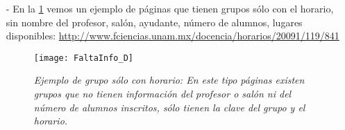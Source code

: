 \begin{itemize}
\item[-] En la \figurename{\ref{SoloHorario}} vemos un ejemplo de páginas que tienen grupos sólo con el horario, sin nombre del profesor, salón, ayudante, número de alumnos, lugares disponibles: \url{http://www.fciencias.unam.mx/docencia/horarios/20091/119/841} %

\begin{figure}[H]
\centering
\texttt{[image: FaltaInfo\_D]} %
\caption[\textit{Ejemplo de grupo sólo con horario}]{\textit{Ejemplo de grupo sólo con horario: En este tipo páginas existen grupos que no tienen información del profesor o salón ni del número de alumnos inscritos, sólo tienen la clave del grupo y el horario.}}\label{SoloHorario}
\end{figure}
\end{itemize}